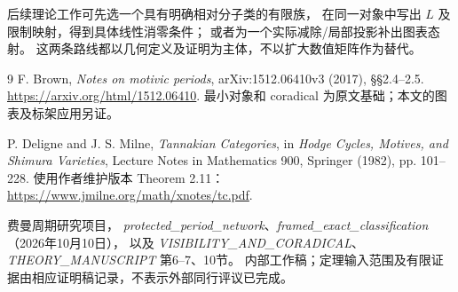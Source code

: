 \documentclass[11pt,a4paper]{ctexart}
\theoremstyle{cnplain}
\theoremstyle{definition}
\theoremstyle{remark}
\begin{document}
后续理论工作可先选一个具有明确相对分子类的有限族，
在同一对象中写出 $L$ 及限制映射，得到具体线性消零条件；
或者为一个实际减除/局部投影补出图表态射。
这两条路线都以几何定义及证明为主体，不以扩大数值矩阵作为替代。

\begin{thebibliography}{9}
F. Brown,
\emph{Notes on motivic periods}, arXiv:1512.06410v3 (2017),
\S\S2.4--2.5.
\url{https://arxiv.org/html/1512.06410}.
最小对象和 coradical 为原文基础；本文的图表及标架应用另证。

P. Deligne and J. S. Milne,
\emph{Tannakian Categories}, in \emph{Hodge Cycles, Motives, and Shimura Varieties},
Lecture Notes in Mathematics 900, Springer (1982), pp. 101--228.
使用作者维护版本 Theorem 2.11：
\url{https://www.jmilne.org/math/xnotes/tc.pdf}.

费曼周期研究项目，
\emph{protected\_period\_network}、\emph{framed\_exact\_classification}（2026年10月10日），
以及 \emph{VISIBILITY\_AND\_CORADICAL}、\emph{THEORY\_MANUSCRIPT} 第6--7、10节。
内部工作稿；定理输入范围及有限证据由相应证明稿记录，不表示外部同行评议已完成。
\end{thebibliography}
\end{document}
